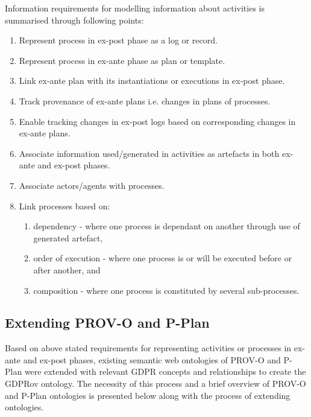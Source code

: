 Information requirements for modelling information about activities is summarised through following points:
\begin{enumerate}
    \item Represent process in ex-post phase as a log or record.
    \item Represent process in ex-ante phase as plan or template.
    \item Link ex-ante plan with its instantiations or executions in ex-post phase.
    \item Track provenance of ex-ante plans i.e. changes in plans of processes.
    \item Enable tracking changes in ex-post logs based on corresponding changes in ex-ante plans.
    \item Associate information used/generated in activities as artefacts in both ex-ante and ex-post phases.
    \item Associate actors/agents with processes.
    \item Link processes based on:
        \begin{enumerate}
            \item dependency - where one process is dependant on another through use of generated artefact,
            \item order of execution - where one process is or will be executed before or after another, and
            \item composition - where one process is constituted by several sub-processes.
        \end{enumerate}
\end{enumerate}

\subsection{Extending PROV-O and P-Plan}
Based on above stated requirements for representing activities or processes in ex-ante and ex-post phases, existing semantic web ontologies of PROV-O \cite{lebo_prov-o_2013} and P-Plan \cite{garijo_p-plan_2014} were extended with relevant GDPR concepts and relationships to create the GDPRov ontology. The necessity of this process and a brief overview of PROV-O and P-Plan ontologies is presented below along with the process of extending ontologies.

